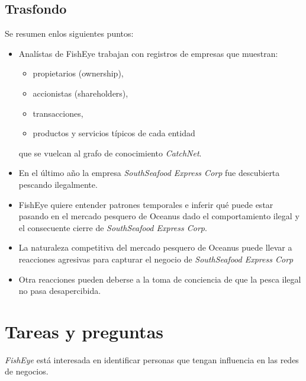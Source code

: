 \documentclass[11pt,spanish,a4paper]{article}
\begin{document}
\subsection{Trasfondo}
Se resumen enlos siguientes puntos:
\begin{itemize}
	\item Analístas de FishEye trabajan con registros de empresas que muestran:
	\begin{itemize}
		\item propietarios (ownership),
		\item accionistas (shareholders),
		\item transacciones,
		\item productos y servicios típicos de cada entidad
	\end{itemize}
	que se vuelcan al grafo de conocimiento \emph{CatchNet}.
	\item En el último año la empresa \emph{SouthSeafood Express Corp} fue descubierta pescando ilegalmente.
	\item FishEye quiere entender patrones temporales e inferir qué puede estar pasando en el mercado pesquero de Oceanus dado el comportamiento ilegal y el consecuente cierre de \emph{SouthSeafood Express Corp}. 
	\item La naturaleza competitiva del mercado pesquero de Oceanus puede llevar a reacciones agresivas para capturar el negocio de \emph{SouthSeafood Express Corp}
	\item Otra reacciones pueden deberse a la toma de conciencia de que la pesca ilegal no pasa desapercibida.
\end{itemize}


\section{Tareas y preguntas}
\emph{FishEye} está interesada en identificar personas que tengan influencia en las redes de negocios.
\end{document}
